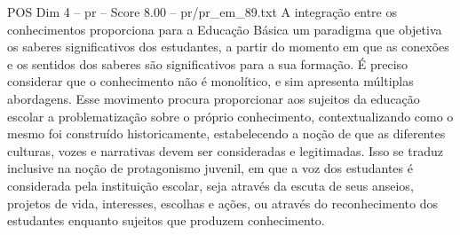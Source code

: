 \begin{textsample}{POS Dim 4 – pr – Score 8.00 – pr/pr\_em\_89.txt}
A integração entre os conhecimentos proporciona para a Educação Básica um paradigma que objetiva os saberes significativos dos estudantes, a partir do momento em que as conexões e os sentidos dos saberes são significativos para a sua formação.
É preciso considerar que o conhecimento não é monolítico, e sim apresenta múltiplas abordagens.
Esse movimento procura proporcionar aos sujeitos da educação escolar a problematização sobre o próprio conhecimento, contextualizando como o mesmo foi construído historicamente, estabelecendo a noção de que as diferentes culturas, vozes e narrativas devem ser consideradas e legitimadas.
Isso se traduz inclusive na noção de protagonismo juvenil, em que a voz dos estudantes é considerada pela instituição escolar, seja através da escuta de seus anseios, projetos de vida, interesses, escolhas e ações, ou através do reconhecimento dos estudantes enquanto sujeitos que produzem conhecimento.

\end{textsample}

